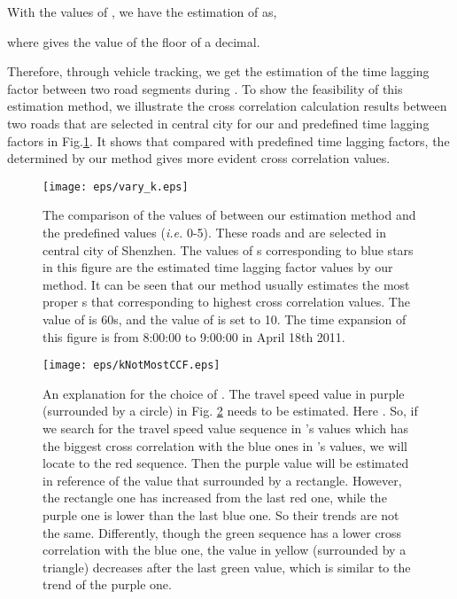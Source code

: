 \documentclass[twocolumn,10pt,final,conference]{IEEEtran}
\def\ie{\textit{i.e.}\xspace}
\begin{document}
With the values of , we have the estimation of  as,

where  gives the value of the floor of a decimal.

Therefore, through vehicle tracking, we get the estimation of the time lagging factor between two road segments during .
To show the feasibility of this estimation method, we illustrate the cross correlation calculation results between two roads that are selected in central city for our  and predefined time lagging factors in Fig.\ref{fig-different time lagging factors for u and r}. It shows that compared with predefined time lagging factors, the  determined by our method gives more evident cross correlation values.

\begin{figure}[h]
  \centering
  \texttt{[image: eps/vary\_k.eps]}
  \caption{The comparison of the values of  between our estimation method and the predefined values (\ie 0-5). These roads  and  are selected in central city of Shenzhen.  The values of s corresponding to blue stars in this figure are the estimated time lagging factor values by our method. It can be seen that our method usually estimates the most proper s that corresponding to highest cross correlation values. The value of  is 60s, and the value of  is set to 10. The time expansion of this figure is from 8:00:00 to 9:00:00 in April 18th 2011.}
  \label{fig-different time lagging factors for u and r}
\end{figure}

\begin{figure}[h]
  \centering
  \texttt{[image: eps/kNotMostCCF.eps]}
  \caption{An explanation for the choice of . The travel speed value in purple (surrounded by a circle) in Fig. \ref{fig-kNotMostCCF} needs to be estimated. Here . So, if we search for the travel speed value sequence in 's values which has the biggest cross correlation with the blue ones in 's values, we will locate to the red sequence. Then the purple value will be estimated in reference of the value that surrounded by a rectangle. However, the rectangle one has increased from the last red one, while the purple one is lower than the last blue one. So their trends are not the same. Differently, though the green sequence has a lower cross correlation with the blue one, the value in yellow (surrounded by a triangle) decreases after the last green value, which is similar to the trend of the purple one.}
  \label{fig-kNotMostCCF}
\end{figure}
\end{document}
